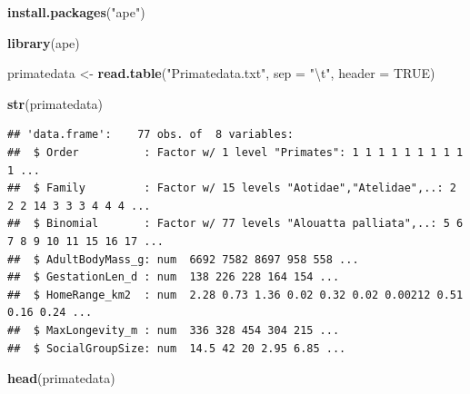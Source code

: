 \documentclass[]{article}
\author{}
\date{}
\newenvironment{Shaded}{\begin{snugshade}}{\end{snugshade}}
\newcommand{\KeywordTok}[1]{\textcolor[rgb]{0.13,0.29,0.53}{\textbf{{#1}}}}
\newcommand{\DataTypeTok}[1]{\textcolor[rgb]{0.13,0.29,0.53}{{#1}}}
\newcommand{\CharTok}[1]{\textcolor[rgb]{0.31,0.60,0.02}{{#1}}}
\newcommand{\StringTok}[1]{\textcolor[rgb]{0.31,0.60,0.02}{{#1}}}
\newcommand{\OtherTok}[1]{\textcolor[rgb]{0.56,0.35,0.01}{{#1}}}
\newcommand{\NormalTok}[1]{{#1}}
\begin{document}
\begin{Shaded}
\begin{Highlighting}[]
\KeywordTok{install.packages}\NormalTok{(}\StringTok{"ape"}\NormalTok{)}
\end{Highlighting}
\end{Shaded}

\begin{Shaded}
\begin{Highlighting}[]
\KeywordTok{library}\NormalTok{(ape)}
\end{Highlighting}
\end{Shaded}

\begin{Shaded}
\begin{Highlighting}[]
\NormalTok{primatedata <-}\StringTok{ }\KeywordTok{read.table}\NormalTok{(}\StringTok{"Primatedata.txt"}\NormalTok{, }\DataTypeTok{sep =} \StringTok{"}\CharTok{\textbackslash{}t}\StringTok{"}\NormalTok{, }\DataTypeTok{header =} \OtherTok{TRUE}\NormalTok{)}
\end{Highlighting}
\end{Shaded}

\begin{Shaded}
\begin{Highlighting}[]
\KeywordTok{str}\NormalTok{(primatedata)}
\end{Highlighting}
\end{Shaded}

\begin{verbatim}
## 'data.frame':    77 obs. of  8 variables:
##  $ Order          : Factor w/ 1 level "Primates": 1 1 1 1 1 1 1 1 1 1 ...
##  $ Family         : Factor w/ 15 levels "Aotidae","Atelidae",..: 2 2 2 14 3 3 3 4 4 4 ...
##  $ Binomial       : Factor w/ 77 levels "Alouatta palliata",..: 5 6 7 8 9 10 11 15 16 17 ...
##  $ AdultBodyMass_g: num  6692 7582 8697 958 558 ...
##  $ GestationLen_d : num  138 226 228 164 154 ...
##  $ HomeRange_km2  : num  2.28 0.73 1.36 0.02 0.32 0.02 0.00212 0.51 0.16 0.24 ...
##  $ MaxLongevity_m : num  336 328 454 304 215 ...
##  $ SocialGroupSize: num  14.5 42 20 2.95 6.85 ...
\end{verbatim}

\begin{Shaded}
\begin{Highlighting}[]
\KeywordTok{head}\NormalTok{(primatedata)}
\end{Highlighting}
\end{Shaded}
\end{document}

